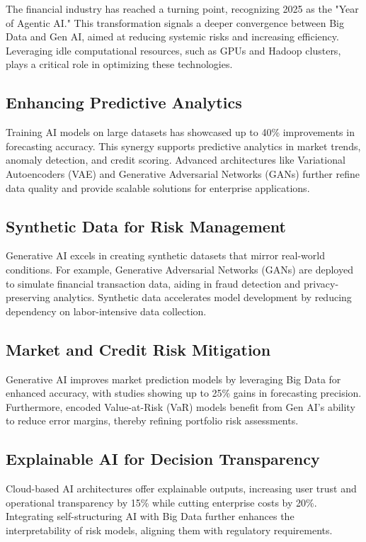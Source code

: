 \documentclass[a4paper,headinclude=on,footinclude=on,12pt,oneside]{scrbook}
\begin{document}
	The financial industry has reached a turning point, recognizing 2025 as the "Year of Agentic AI." This transformation signals a deeper convergence between Big Data and Gen AI, aimed at reducing systemic risks and increasing efficiency. Leveraging idle computational resources, such as GPUs and Hadoop clusters, plays a critical role in optimizing these technologies.
	
	
	\subsection{Enhancing Predictive Analytics}
	Training AI models on large datasets has showcased up to 40\% improvements in forecasting accuracy. This synergy supports predictive analytics in market trends, anomaly detection, and credit scoring. Advanced architectures like Variational Autoencoders (VAE) and Generative Adversarial Networks (GANs) further refine data quality and provide scalable solutions for enterprise applications.
	
	\subsection{Synthetic Data for Risk Management}
	Generative AI excels in creating synthetic datasets that mirror real-world conditions. For example, Generative Adversarial Networks (GANs) are deployed to simulate financial transaction data, aiding in fraud detection and privacy-preserving analytics. Synthetic data accelerates model development by reducing dependency on labor-intensive data collection.
	
	
	\subsection{Market and Credit Risk Mitigation}
	Generative AI improves market prediction models by leveraging Big Data for enhanced accuracy, with studies showing up to 25\% gains in forecasting precision. Furthermore, encoded Value-at-Risk (VaR) models benefit from Gen AI’s ability to reduce error margins, thereby refining portfolio risk assessments.
	
	\subsection{Explainable AI for Decision Transparency}
	Cloud-based AI architectures offer explainable outputs, increasing user trust and operational transparency by 15\% while cutting enterprise costs by 20\%. Integrating self-structuring AI with Big Data further enhances the interpretability of risk models, aligning them with regulatory requirements.
	
\end{document}
